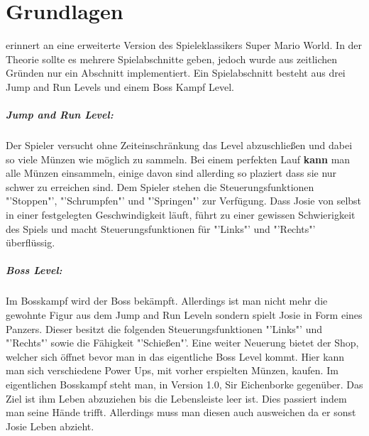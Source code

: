 \chapter{Grundlagen}\label{ch:grundl}



\gamename  erinnert an eine erweiterte Version des Spieleklassikers Super Mario World.
In der Theorie sollte es mehrere Spielabschnitte geben, jedoch wurde aus zeitlichen Gründen nur ein Abschnitt implementiert. Ein Spielabschnitt besteht aus drei Jump and Run Levels und einem Boss Kampf Level. 

\paragraph{Jump and Run Level:}
Der Spieler versucht ohne Zeiteinschränkung das Level abzuschließen und dabei so viele Münzen wie möglich zu sammeln. Bei einem perfekten Lauf \textbf{kann} man alle Münzen einsammeln, einige davon sind allerding so plaziert dass sie nur schwer zu erreichen sind.
Dem Spieler stehen die Steuerungsfunktionen "'Stoppen"', "'Schrumpfen"' und "'Springen"' zur Verfügung. 
Dass Josie von selbst in einer festgelegten Geschwindigkeit läuft, führt zu einer gewissen Schwierigkeit des Spiels und macht Steuerungsfunktionen für "'Links"' und "'Rechts"' überflüssig.

\paragraph{Boss Level:}
Im Bosskampf wird der Boss bekämpft. Allerdings ist man nicht mehr die gewohnte Figur aus dem Jump and Run Leveln sondern spielt Josie in Form eines Panzers. Dieser besitzt die folgenden Steuerungsfunktionen "'Links"' und "'Rechts"' sowie die Fähigkeit "'Schießen"'. Eine weiter Neuerung bietet der Shop, welcher sich öffnet bevor man in das eigentliche Boss Level kommt. Hier kann man sich verschiedene Power Ups, mit vorher erspielten Münzen, kaufen. Im eigentlichen Bosskampf steht man, in Version 1.0, Sir Eichenborke gegenüber. Das Ziel ist ihm Leben abzuziehen bis die Lebensleiste leer ist. Dies passiert indem man seine Hände trifft. Allerdings muss man diesen auch ausweichen da er sonst Josie Leben abzieht.


